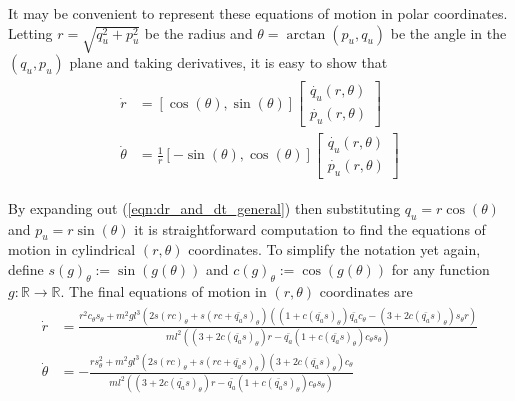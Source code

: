 It may be convenient to represent these equations of motion  in polar coordinates.
Letting \(r = \sqrt{q_u^2 + p_u^2}\) be the radius and 
\(\theta = \arctan(p_u,q_u)\) be the angle in the \((q_u,p_u)\) plane and taking
derivatives, it is easy to show that
\begin{align}\label{eqn:dr_and_dt_general}
\begin{split}
    \dot{r} &= [\cos(\theta),\sin(\theta)]
    \begin{bmatrix} \dot{q_u}(r,\theta) \\ \dot{p_u}(r,\theta) \end{bmatrix} \\
    \dot{\theta} &= \frac{1}{r}[-\sin(\theta), \cos(\theta)]
    \begin{bmatrix} \dot{q_u}(r,\theta) \\ \dot{p_u}(r,\theta) \end{bmatrix}
\end{split}
\end{align}

By expanding out (\ref{eqn:dr_and_dt_general}) then substituting \(q_u = r\cos(\theta)\)
and \(p_u = r\sin(\theta)\)
it is straightforward computation to find the equations of motion in cylindrical \((r,\theta)\)
coordinates. To simplify the notation yet again, define
\(s(g)_\theta := \sin(g(\theta))\) and \(c(g)_\theta := \cos(g(\theta))\) 
for any function \(g: \mathbb{R} \rightarrow \mathbb{R}\). The final equations
of motion in \((r,\theta)\) coordinates are
\begin{align}\label{eqn:acrobot_eom_rt}
\begin{split}
    \dot{r} &= \frac
    {
        r^2 c_\theta s_\theta 
        + m^2 g l^3 (2 s(rc)_\theta + s(rc + \bar{q_a}s)_\theta)
        \left(
            (1+c(\bar{q_a}s)_\theta)\bar{q_a}c_\theta 
            - (3 + 2c(\bar{q_a}s)_\theta)s_\theta r
        \right)
    }
    {
        m l^2 \left((3+2c(\bar{q_a}s)_\theta)r 
        - \bar{q_a}(1+ c(\bar{q_a}s)_\theta)c_\theta s_\theta\right)
    }\\
    \dot{\theta} &= -\frac
    {
        r s_\theta^2
        + m^2 g l^3 (2 s(rc)_\theta + s(rc + \bar{q_a}s)_\theta)
        (3 + 2c(\bar{q_a}s)_\theta)c_\theta
    }
    {
        m l^2 \left((3+2c(\bar{q_a}s)_\theta)r 
        - \bar{q_a}(1+ c(\bar{q_a}s)_\theta)c_\theta s_\theta\right)
    }
\end{split}
\end{align}


